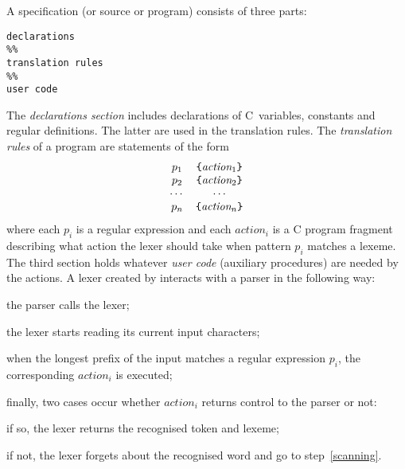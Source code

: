 A \Lex specification (or source or program) consists of three parts:
\begin{verbatim}
declarations
%%
translation rules
%%
user code
\end{verbatim}
The \emph{declarations section} includes declarations of C~variables,
constants and regular definitions. The latter are used in the
translation rules. The \emph{translation rules} of a \Lex program are
statements of the form
\begin{equation*}
\begin{array}{cc}
p_1 & \verb+{+ \textit{action}_1 \verb+}+\\
p_2 & \verb+{+ \textit{action}_2 \verb+}+\\
\cdots & \cdots\\
p_n & \verb+{+ \textit{action}_n \verb+}+
\end{array}
\end{equation*}
where each \(p_i\) is a regular expression and each
\(\textit{action}_i\) is a C program fragment describing what action
the lexer should take when pattern \(p_i\) matches a lexeme. The third
section holds whatever \emph{user code} (auxiliary procedures) are
needed by the actions. A lexer created by \Lex interacts with a parser
in the following way:
\begin{enumerate*}

  \item the parser calls the lexer;

  \item the lexer starts reading its current input
  characters; \label{scanning}

  \item when the longest prefix of the input matches a regular
    expression \(p_i\), the corresponding \(\textit{action}_i\) is
    executed;

  \item finally, two cases occur whether \(\textit{action}_i\) returns
    control to the parser or not:
    \begin{enumerate*}

      \item if so, the lexer returns the recognised token and lexeme;

      \item if not, the lexer forgets about the recognised word and
      go to step~\ref{scanning}.

    \end{enumerate*}

\end{enumerate*}

